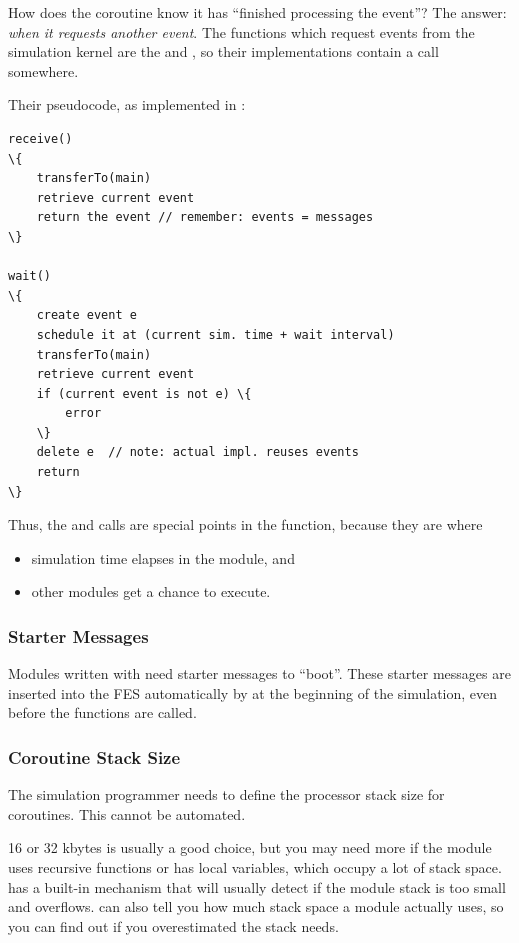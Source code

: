 How does the coroutine know it has ``finished processing the event''?
The answer: \textit{when it requests another event}.  The functions
which request events from the simulation kernel are the
 and , so their
implementations contain a  call
somewhere.


Their pseudocode, as implemented in {\opp}:


\begin{Verbatim}[commandchars=\\\{\}]
receive()
\{
    transferTo(main)
    retrieve current event
    return the event // remember: events = messages
\}

wait()
\{
    create event e
    schedule it at (current sim. time + wait interval)
    transferTo(main)
    retrieve current event
    if (current event is not e) \{
        error
    \}
    delete e  // note: actual impl. reuses events
    return
\}
\end{Verbatim}



Thus, the  and  calls are
special points in the  function, because
they are where

\begin{itemize}
  \item{simulation time elapses in the module, and}
  \item{other modules get a chance to execute.}
\end{itemize}


\subsubsection{Starter Messages}


Modules written with  need starter
messages to ``boot''.  These starter messages
are inserted into the FES automatically by {\opp} at the
beginning of the simulation, even before the 
functions are called.


\subsubsection{Coroutine Stack Size}


The simulation programmer needs to define the processor stack size
for coroutines. This cannot be automated.

16 or 32 kbytes is usually a good choice, but you may need more if the
module uses recursive functions or has local variables, which occupy a
lot of stack space. {\opp} has a built-in mechanism that will usually
detect if the module stack is too small and overflows.
{\opp} can also tell you how much stack space a module actually uses,
so you can find out if you overestimated the stack needs.


